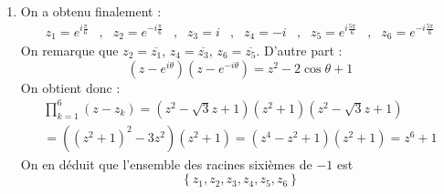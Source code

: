 \begin{enumerate}
\item On a obtenu finalement :
\begin{align*}
 z_1=e^{i\frac{\pi}{6}} &, & z_2=e^{-i\frac{\pi}{6}} &, & z_3=i &, &
z_4=-i &, & z_5=e^{i\frac{5\pi}{6}} &, & z_6=e^{-i\frac{5\pi}{6}}
\end{align*}
On remarque que $z_2=\overline{z_1}$, $z_4=\overline{z_3}$, $z_6=\overline{z_5}$. D'autre part :
\begin{displaymath}
 (z-e^{i\theta})(z-e^{-i\theta})=z^2-2\cos\theta +1
\end{displaymath}
On obtient donc :
\begin{multline*}
 \prod_{k=1}^{6}(z-z_k)=(z^2-\sqrt{3}z+1)(z^2+1)(z^2-\sqrt{3}z+1) \\
=\left( (z^2+1)^2-3z^2\right)(z^2+1)=(z^4-z^2+1)(z^2+1)=z^6+1 
\end{multline*}
On en déduit que l'ensemble des racines sixièmes de $-1$ est 
\begin{displaymath}
 \left\lbrace z_1,z_2,z_3,z_4,z_5,z_6\right\rbrace
\end{displaymath}
\end{enumerate}
